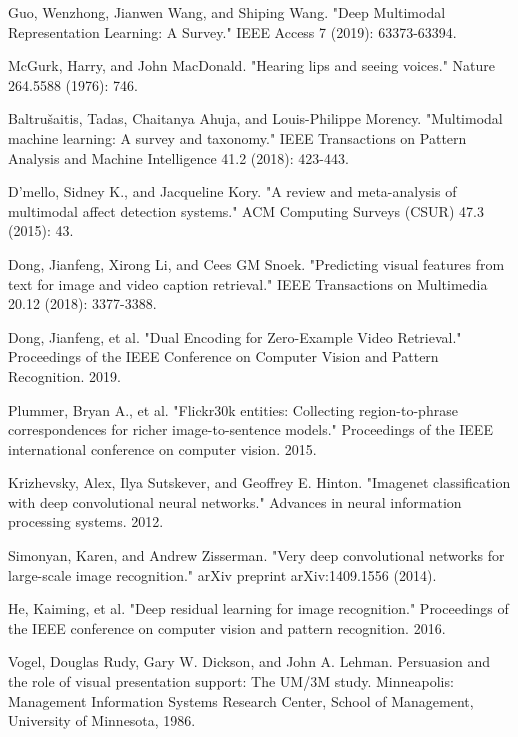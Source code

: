 \documentclass[runningheads]{llncs}
\begin{document}
%
%
%
% 
% 
%
\begin{thebibliography}{8}
Guo, Wenzhong, Jianwen Wang, and Shiping Wang. "Deep Multimodal Representation Learning: A Survey." IEEE Access 7 (2019): 63373-63394.

McGurk, Harry, and John MacDonald. "Hearing lips and seeing voices." Nature 264.5588 (1976): 746.

Baltrušaitis, Tadas, Chaitanya Ahuja, and Louis-Philippe Morency. "Multimodal machine learning: A survey and taxonomy." IEEE Transactions on Pattern Analysis and Machine Intelligence 41.2 (2018): 423-443.

D'mello, Sidney K., and Jacqueline Kory. "A review and meta-analysis of multimodal affect detection systems." ACM Computing Surveys (CSUR) 47.3 (2015): 43.

Dong, Jianfeng, Xirong Li, and Cees GM Snoek. "Predicting visual features from text for image and video caption retrieval." IEEE Transactions on Multimedia 20.12 (2018): 3377-3388.

Dong, Jianfeng, et al. "Dual Encoding for Zero-Example Video Retrieval." Proceedings of the IEEE Conference on Computer Vision and Pattern Recognition. 2019.

Plummer, Bryan A., et al. "Flickr30k entities: Collecting region-to-phrase correspondences for richer image-to-sentence models." Proceedings of the IEEE international conference on computer vision. 2015.

Krizhevsky, Alex, Ilya Sutskever, and Geoffrey E. Hinton. "Imagenet classification with deep convolutional neural networks." Advances in neural information processing systems. 2012.

Simonyan, Karen, and Andrew Zisserman. "Very deep convolutional networks for large-scale image recognition." arXiv preprint arXiv:1409.1556 (2014).

He, Kaiming, et al. "Deep residual learning for image recognition." Proceedings of the IEEE conference on computer vision and pattern recognition. 2016.

Vogel, Douglas Rudy, Gary W. Dickson, and John A. Lehman. Persuasion and the role of visual presentation support: The UM/3M study. Minneapolis: Management Information Systems Research Center, School of Management, University of Minnesota, 1986.


\end{thebibliography}
\end{document}
